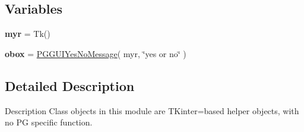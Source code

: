 \subsection*{Variables}
\begin{DoxyCompactItemize}
\item 
{\bfseries myr} = Tk()\hypertarget{namespacenegui_1_1pgguiutilities_a75a5dbc8c7b94aad724fb2a05bbb8eb4}{}\label{namespacenegui_1_1pgguiutilities_a75a5dbc8c7b94aad724fb2a05bbb8eb4}

\item 
{\bfseries obox} = \hyperlink{classnegui_1_1pgguiutilities_1_1PGGUIYesNoMessage}{P\+G\+G\+U\+I\+Yes\+No\+Message}( myr, \char`\"{}yes or no\char`\"{} )\hypertarget{namespacenegui_1_1pgguiutilities_ab1ebc635d4419aaa781aee13c9471a72}{}\label{namespacenegui_1_1pgguiutilities_ab1ebc635d4419aaa781aee13c9471a72}

\end{DoxyCompactItemize}


\subsection{Detailed Description}
\begin{DoxyVerb}Description
Class objects in this module are TKinter=based
helper objects, with no PG specific function.
\end{DoxyVerb}
 